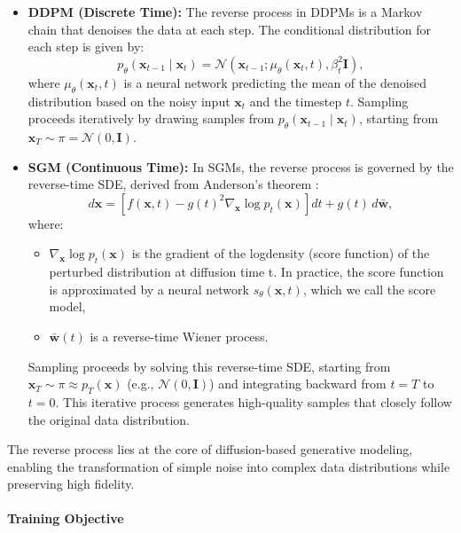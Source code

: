 \begin{itemize}
    \item \textbf{DDPM (Discrete Time):}
    The reverse process in DDPMs is a Markov chain that denoises the data at each step. The conditional distribution for each step is given by:
    \[
    p_\theta(\mathbf{x}_{t-1} \mid \mathbf{x}_t) = \mathcal{N}\left(\mathbf{x}_{t-1}; \mu_\theta(\mathbf{x}_t, t), \beta_t^2 \mathbf{I}\right),
    \]
    where \( \mu_\theta(\mathbf{x}_t, t) \) is a neural network predicting the mean of the denoised distribution based on the noisy input \( \mathbf{x}_t \) and the timestep \( t \). Sampling proceeds iteratively by drawing samples from \( p_\theta(\mathbf{x}_{t-1} \mid \mathbf{x}_t) \), starting from \( \mathbf{x}_T \sim \pi = \mathcal{N}(0, \mathbf{I}) \).

    \item \textbf{SGM (Continuous Time):}
    In SGMs, the reverse process is governed by the reverse-time SDE, derived from Anderson’s theorem \cite{anderson1982reverse_time_sde}:
    \[
    d\mathbf{x} = \left[f(\mathbf{x}, t) - g(t)^2 \nabla_\mathbf{x} \log p_t(\mathbf{x})\right] dt + g(t) \, d\bar{\mathbf{w}},
    \]
    where:
    \begin{itemize}
        \item \( \nabla_\mathbf{x} \log p_t(\mathbf{x}) \) is the gradient of the logdensity (score function) of the perturbed distribution at diffusion time t. In practice, the score function is approximated by a neural network \( s_\theta(\mathbf{x}, t) \), which we call the score model,
        \item \( \bar{\mathbf{w}}(t) \) is a reverse-time Wiener process.
    \end{itemize}
    Sampling proceeds by solving this reverse-time SDE, starting from \( \mathbf{x}_T \sim \pi \approx p_T(\mathbf{x}) \) (e.g., \( \mathcal{N}(0, \mathbf{I}) \)) and integrating backward from $t=T$ to $t = 0$. This iterative process generates high-quality samples that closely follow the original data distribution.
\end{itemize}

The reverse process lies at the core of diffusion-based generative modeling, enabling the transformation of simple noise into complex data distributions while preserving high fidelity.


\paragraph{Training Objective}

